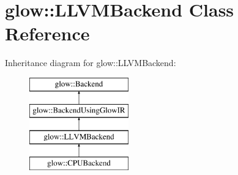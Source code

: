 \hypertarget{classglow_1_1_l_l_v_m_backend}{}\section{glow\+:\+:L\+L\+V\+M\+Backend Class Reference}
\label{classglow_1_1_l_l_v_m_backend}
Inheritance diagram for glow\+:\+:L\+L\+V\+M\+Backend\+:\begin{figure}[H]
\begin{center}
\leavevmode
\includegraphics[height=4.000000cm]{classglow_1_1_l_l_v_m_backend}
\end{center}
\end{figure}
